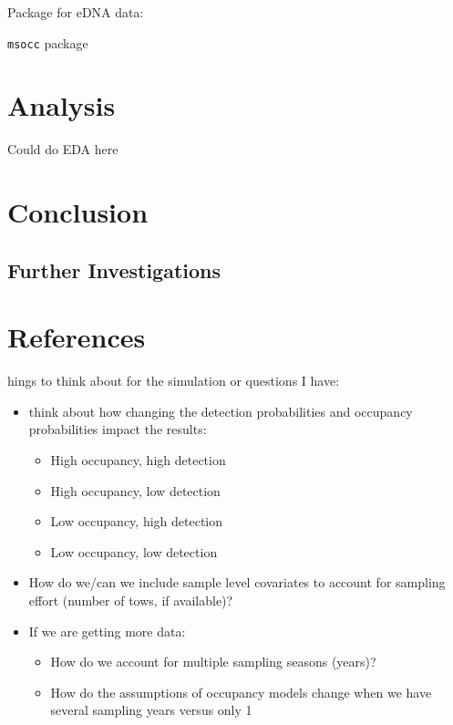 \documentclass[12pt]{article}\usepackage[]{graphicx}\usepackage[]{color}
\begin{document}
Package for eDNA data: 

\texttt{msocc} package

\section{Analysis}

Could do EDA here

\section{Conclusion}

\subsection{Further Investigations}

\newpage
\section{References}
\begingroup
\renewcommand{\section}[2]{}%
\begin{flushleft}

%
%
%
%

\end{flushleft}
\endgroup

\newpage
\section{Appendix - R Code}

Things to think about for the simulation or questions I have: 
\begin{itemize}
\item think about how changing the detection probabilities and occupancy probabilities impact the results: 
	\begin{itemize}
	\item High occupancy, high detection
	\item High occupancy, low detection 
	\item Low occupancy, high detection 
	\item Low occupancy, low detection 
	\end{itemize}
\item How do we/can we include sample level covariates to account for sampling effort (number of tows, if available)?
\item If we are getting more data:
	\begin{itemize}
	\item How do we account for multiple sampling seasons (years)? 
	\item How do the assumptions of occupancy models change when we have several sampling years versus only 1
\end{itemize}
\end{itemize}
\end{document}
